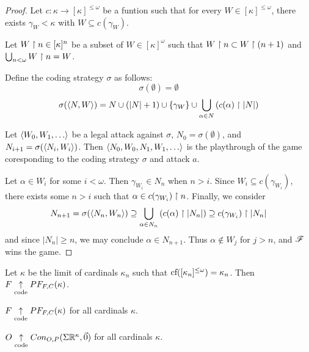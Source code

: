 \begin{proof}
Let $c:\kappa\to[\kappa]^{\leq \omega}$ be a funtion such that for every
$W\in[\kappa]^{\leq\omega}$, there exists $\gamma_W<\kappa$ with
$W\subseteq c(\gamma_W)$.

Let $W\restriction n \in [\kappa]^n$ be a subset of $W\in[\kappa]^\omega$ such that
$W\restriction n \subset W \restriction (n+1)$ and $\bigcup_{n<\omega} W\restriction n = W$.

Define the coding strategy $\sigma$ as follows:
  \[
    \sigma(\emptyset) = \emptyset
  \]
  \[
    \sigma(\langle N,W\rangle)
      =
    N
      \cup
    (|N|+1)
      \cup
    \{\gamma_W\}
      \cup
    \bigcup_{\alpha \in N}\left(c(\alpha) \restriction |N|\right)
  \]

Let $\<W_0,W_1,\dots\>$ be a legal attack against $\sigma$,
$N_0=\sigma(\emptyset)$, and
$N_{i+1}=\sigma(\langle N_i,W_i\rangle)$. Then $\<N_0,W_0,N_1,W_1,\dots\>$ is the
playthrough of the game coresponding to the coding strategy $\sigma$ and
attack $a$.

Let $\alpha\in W_i$ for some $i<\omega$. Then $\gamma_{W_i}\in N_n$ when
$n>i$. Since $W_i\subseteq c(\gamma_{W_i})$, there exists some $n>i$ such
that $\alpha\in c(\gamma_{W_i})\restriction n$.
Finally, we consider
  \[
    N_{n+1}
      =
    \sigma(\langle N_n,W_n\rangle)
      \supseteq
    \bigcup_{\alpha\in N_n}\left(c(\alpha) \restriction |N_n|\right)
      \supseteq
    c(\gamma_{W_i})\restriction |N_n|
  \]
and since $|N_n|\geq n$, we may conclude $\alpha\in N_{n+1}$.
Thus $\alpha\not\in W_j$ for $j>n$, and $\mathscr{F}$ wins the game.
\end{proof}

\begin{thm}
  Let $\kappa$ be the limit of cardinals $\kappa_n$ such that
  $\textrm{cf}([\kappa_n]^{\leq\omega})=\kappa_n$.
  Then $F \underset{\text{code}}{\uparrow} PF_{F,C}(\kappa)$.
\end{thm}

\begin{thm}
  $F\underset{\text{code}}{\uparrow}PF_{F,C}(\kappa)$ for all cardinals $\kappa$.
\end{thm}

\begin{cor}
  $O\underset{\text{code}}{\uparrow}Con_{O,P}(\Sigma\mathbb{R}^{\kappa},\vec{0})$
  for all cardinals $\kappa$.
\end{cor}
